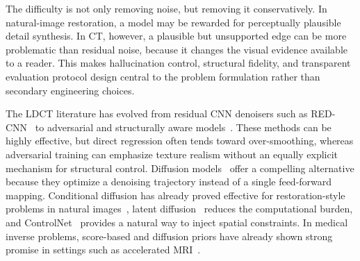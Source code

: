 \documentclass{article}
\begin{document}
The difficulty is not only removing noise, but removing it conservatively. In natural-image restoration, a model may be rewarded for perceptually plausible detail synthesis. In CT, however, a plausible but unsupported edge can be more problematic than residual noise, because it changes the visual evidence available to a reader. This makes hallucination control, structural fidelity, and transparent evaluation protocol design central to the problem formulation rather than secondary engineering choices.

The LDCT literature has evolved from residual CNN denoisers such as RED-CNN~\cite{chen2017} to adversarial and structurally aware models~\cite{yang2018,yi2018,you2018}. These methods can be highly effective, but direct regression often tends toward over-smoothing, whereas adversarial training can emphasize texture realism without an equally explicit mechanism for structural control. Diffusion models~\cite{sohldickstein2015,ho2020,nichol2021,song2021sde,song2021ddim} offer a compelling alternative because they optimize a denoising trajectory instead of a single feed-forward mapping. Conditional diffusion has already proved effective for restoration-style problems in natural images~\cite{saharia2021}, latent diffusion~\cite{rombach2022} reduces the computational burden, and ControlNet~\cite{zhang2023controlnet} provides a natural way to inject spatial constraints. In medical inverse problems, score-based and diffusion priors have already shown strong promise in settings such as accelerated MRI~\cite{chung2022}.
\end{document}
